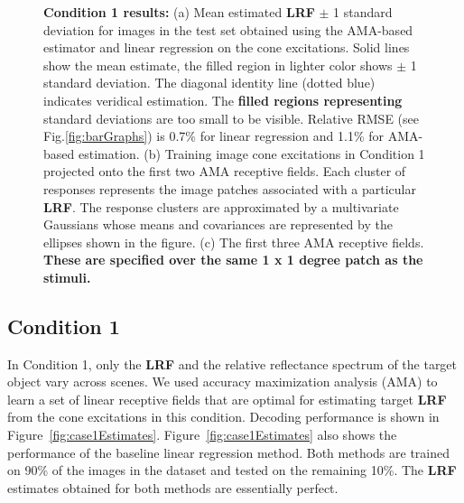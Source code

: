 \documentclass{jov}
\providecommand{\DIFaddtex}[1]{{\bf #1}} %
\providecommand{\DIFdeltex}[1]{} %
\providecommand{\DIFaddbegin}{} %
\providecommand{\DIFaddend}{} %
\providecommand{\DIFdelbegin}{} %
\providecommand{\DIFdelend}{} %
\providecommand{\DIFaddFL}[1]{\DIFadd{#1}} %
\providecommand{\DIFdelFL}[1]{\DIFdel{#1}} %
\providecommand{\DIFaddbeginFL}{} %
\providecommand{\DIFaddendFL}{} %
\providecommand{\DIFdelbeginFL}{} %
\providecommand{\DIFdelendFL}{} %
\providecommand{\DIFadd}[1]{\texorpdfstring{\DIFaddtex{#1}}{#1}} %
\providecommand{\DIFdel}[1]{\texorpdfstring{\DIFdeltex{#1}}{}} %
\newcommand{\DIFscaledelfig}{0.5}
\newlength{\DIFdelgraphicswidth} %
\newlength{\DIFdelgraphicsheight} %
\newcommand{\DIFaddincludegraphics}[2][]{{\color{blue}\fbox{\DIFOincludegraphics[#1]{#2}}}} %
\newcommand{\DIFdelincludegraphics}[2][]{%
\sbox{\DIFdelgraphicsbox}{\DIFOincludegraphics[#1]{#2}}%
\settoboxwidth{\DIFdelgraphicswidth}{\DIFdelgraphicsbox} %
\settoboxtotalheight{\DIFdelgraphicsheight}{\DIFdelgraphicsbox} %
\scalebox{\DIFscaledelfig}{%
\parbox[b]{\DIFdelgraphicswidth}{\usebox{\DIFdelgraphicsbox}\\[-\baselineskip] \rule{\DIFdelgraphicswidth}{0em}}\llap{\resizebox{\DIFdelgraphicswidth}{\DIFdelgraphicsheight}{%
\setlength{\unitlength}{\DIFdelgraphicswidth}%
\begin{picture}(1,1)%
\thicklines\linethickness{2pt} %
{\color[rgb]{1,0,0}\put(0,0){\framebox(1,1){}}}%
{\color[rgb]{1,0,0}\put(0,0){\line( 1,1){1}}}%
{\color[rgb]{1,0,0}\put(0,1){\line(1,-1){1}}}%
\end{picture}%
}\hspace*{3pt}}} %
} %
\DeclareRobustCommand{\DIFaddbegin}{\DIFOaddbegin \let\includegraphics\DIFaddincludegraphics} %
\DeclareRobustCommand{\DIFaddend}{\DIFOaddend \let\includegraphics\DIFOincludegraphics} %
\DeclareRobustCommand{\DIFdelbegin}{\DIFOdelbegin \let\includegraphics\DIFdelincludegraphics} %
\DeclareRobustCommand{\DIFdelend}{\DIFOaddend \let\includegraphics\DIFOincludegraphics} %
\DeclareRobustCommand{\DIFaddbeginFL}{\DIFOaddbeginFL \let\includegraphics\DIFaddincludegraphics} %
\DeclareRobustCommand{\DIFaddendFL}{\DIFOaddendFL \let\includegraphics\DIFOincludegraphics} %
\DeclareRobustCommand{\DIFdelbeginFL}{\DIFOdelbeginFL \let\includegraphics\DIFdelincludegraphics} %
\DeclareRobustCommand{\DIFdelendFL}{\DIFOaddendFL \let\includegraphics\DIFOincludegraphics} %
\begin{document}
\begin{figure}
\begin{subfigure}[b]{0.32 \textwidth}
	\label{fig:case1RFs}
    \end{subfigure}   
    \caption{{\bf Condition 1 results:} (a) Mean estimated \DIFdelbeginFL \DIFdelFL{LRV }\DIFdelendFL \DIFaddbeginFL \DIFaddFL{LRF }\DIFaddendFL $\pm$ 1 standard deviation for images in the test set obtained using the AMA-based estimator and linear regression on the cone excitations. Solid lines show the mean estimate, the filled region in lighter color shows $\pm$ 1 standard deviation. The diagonal identity line (dotted blue) indicates veridical estimation. The \DIFaddbeginFL \DIFaddFL{filled regions representing }\DIFaddendFL standard deviations are too small to be visible. Relative RMSE (see Fig.\ref{fig:barGraphs}) is 0.7\% for linear regression and 1.1\%  for AMA-based estimation. (b) Training image cone excitations in Condition 1 projected onto the first two AMA receptive fields. Each cluster of responses represents the image patches associated with a particular \DIFdelbeginFL \DIFdelFL{LRV}\DIFdelendFL \DIFaddbeginFL \DIFaddFL{LRF}\DIFaddendFL . The response clusters are approximated by a multivariate Gaussians whose means and covariances are represented by the ellipses shown in the figure. (c) The first three AMA receptive fields. \DIFaddbeginFL \DIFaddFL{These are specified over the same 1 x 1 degree patch as the stimuli.}\DIFaddendFL }
\label{fig:Condition1}
\end{figure}

\subsection{Condition 1}
In Condition 1, only the \DIFdelbegin \DIFdel{LRV }\DIFdelend \DIFaddbegin \DIFadd{LRF }\DIFaddend and the relative reflectance spectrum of the target object vary across scenes.
We used accuracy maximization analysis (AMA) to learn a set of linear receptive fields that are optimal for estimating target \DIFdelbegin \DIFdel{LRV }\DIFdelend \DIFaddbegin \DIFadd{LRF }\DIFaddend from the cone excitations in this condition. 
Decoding performance is shown in Figure~\ref{fig:case1Estimates}. 
Figure~\ref{fig:case1Estimates} also shows the performance of the baseline linear regression method. 
Both methods are trained on 90\% of the images in the dataset and tested on the remaining 10\%.
The \DIFdelbegin \DIFdel{LRV }\DIFdelend \DIFaddbegin \DIFadd{LRF }\DIFaddend estimates obtained for both methods are essentially perfect.
\end{document}

